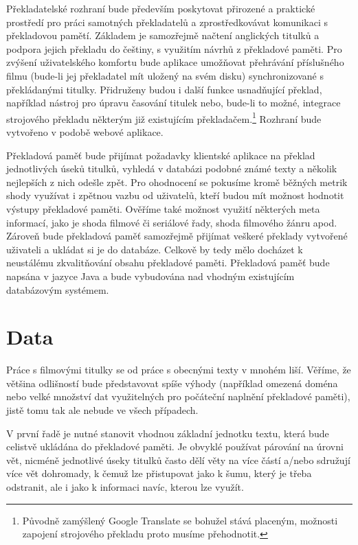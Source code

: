 Překladatelské rozhraní bude především poskytovat přirozené a praktické prostředí pro práci samotných překladatelů a zprostředkovávat komunikaci s překladovou pamětí. Základem je samozřejmě načtení anglických titulků a podpora jejich překladu do češtiny, s využitím návrhů z překladové paměti. Pro zvýšení uživatelského komfortu bude aplikace umožňovat přehrávání příslušného filmu (bude-li jej překladatel mít uložený na svém disku) synchronizované s překládanými titulky. Přidruženy budou i další funkce usnadňující překlad, například nástroj pro úpravu časování titulek nebo, bude-li to možné, integrace strojového překladu některým již existujícím překladačem.\footnote{Původně zamýšlený Google Translate se bohužel stává placeným, možnosti zapojení strojového překladu proto musíme přehodnotit.} Rozhraní bude vytvořeno v podobě webové aplikace.


Překladová paměť bude přijímat požadavky klientské aplikace na překlad jednotlivých úseků titulků, vyhledá v databázi podobné známé texty a několik nejlepších z nich odešle zpět. Pro ohodnocení se pokusíme kromě běžných metrik shody využívat i zpětnou vazbu od uživatelů, kteří budou mít možnost hodnotit výstupy překladové paměti. Ověříme také možnost využití některých meta informací, jako je shoda filmové či seriálové řady, shoda filmového žánru apod. Zároveň bude překladová paměť samozřejmě přijímat veškeré překlady vytvořené uživateli a ukládat si je do databáze. Celkově by tedy mělo docházet k neustálému zkvalitňování obsahu překladové paměti. Překladová paměť bude napsána v jazyce Java a bude vybudována nad vhodným existujícím databázovým systémem.

\section{Data}
Práce s filmovými titulky se od práce s obecnými texty v mnohém liší. Věříme, že většina odlišností bude představovat spíše výhody (například omezená doména nebo velké množství dat využitelných pro počáteční naplnění překladové paměti), jistě tomu tak ale nebude ve všech případech.

V první řadě je nutné stanovit vhodnou základní jednotku textu, která bude celistvě ukládána do překladové paměti. Je obvyklé používat párování na úrovni vět, nicméně jednotlivé úseky titulků často dělí věty na více částí a/nebo sdružují více vět dohromady, k čemuž lze přistupovat jako k šumu, který je třeba odstranit, ale i jako k informaci navíc, kterou lze využít.

